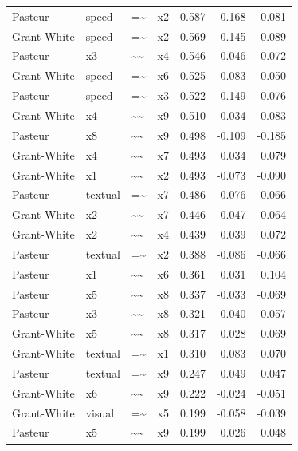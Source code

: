 \documentclass[11pt]{article}
\begin{document}
\begin{longtable}{llllrrr}
Pasteur & speed & =\textasciitilde{} & x2 & 0.587 & -0.168 & -0.081 \\
Grant-White & speed & =\textasciitilde{} & x2 & 0.569 & -0.145 & -0.089 \\
Pasteur & x3 & \textasciitilde{}\textasciitilde{} & x4 & 0.546 & -0.046 & -0.072 \\
Grant-White & speed & =\textasciitilde{} & x6 & 0.525 & -0.083 & -0.050 \\
Pasteur & speed & =\textasciitilde{} & x3 & 0.522 & 0.149 & 0.076 \\
Grant-White & x4 & \textasciitilde{}\textasciitilde{} & x9 & 0.510 & 0.034 & 0.083 \\
Pasteur & x8 & \textasciitilde{}\textasciitilde{} & x9 & 0.498 & -0.109 & -0.185 \\
Grant-White & x4 & \textasciitilde{}\textasciitilde{} & x7 & 0.493 & 0.034 & 0.079 \\
Grant-White & x1 & \textasciitilde{}\textasciitilde{} & x2 & 0.493 & -0.073 & -0.090 \\
Pasteur & textual & =\textasciitilde{} & x7 & 0.486 & 0.076 & 0.066 \\
Grant-White & x2 & \textasciitilde{}\textasciitilde{} & x7 & 0.446 & -0.047 & -0.064 \\
Grant-White & x2 & \textasciitilde{}\textasciitilde{} & x4 & 0.439 & 0.039 & 0.072 \\
Pasteur & textual & =\textasciitilde{} & x2 & 0.388 & -0.086 & -0.066 \\
Pasteur & x1 & \textasciitilde{}\textasciitilde{} & x6 & 0.361 & 0.031 & 0.104 \\
Pasteur & x5 & \textasciitilde{}\textasciitilde{} & x8 & 0.337 & -0.033 & -0.069 \\
Pasteur & x3 & \textasciitilde{}\textasciitilde{} & x8 & 0.321 & 0.040 & 0.057 \\
Grant-White & x5 & \textasciitilde{}\textasciitilde{} & x8 & 0.317 & 0.028 & 0.069 \\
Grant-White & textual & =\textasciitilde{} & x1 & 0.310 & 0.083 & 0.070 \\
Pasteur & textual & =\textasciitilde{} & x9 & 0.247 & 0.049 & 0.047 \\
Grant-White & x6 & \textasciitilde{}\textasciitilde{} & x9 & 0.222 & -0.024 & -0.051 \\
Grant-White & visual & =\textasciitilde{} & x5 & 0.199 & -0.058 & -0.039 \\
Pasteur & x5 & \textasciitilde{}\textasciitilde{} & x9 & 0.199 & 0.026 & 0.048 \\

\end{longtable}
\end{document}
